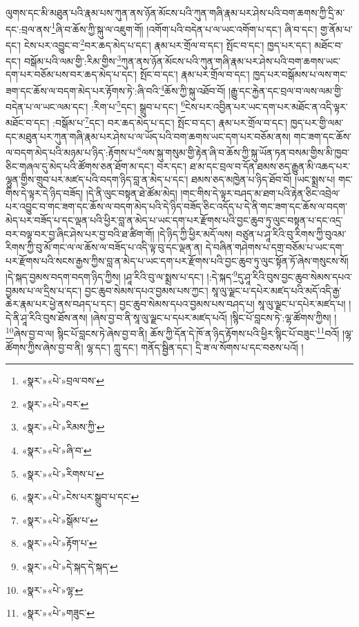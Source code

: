ལུགས་དང་མི་མཐུན་པའི་རྣམ་པས་ཀུན་ནས་ཉོན་མོངས་པའི་ཀུན་གཞི་རྣམ་པར་ཤེས་པའི་བག་ཆགས་ཀྱི་དྲི་མ་དང་:བྲལ་ནས་\footnote{«སྣར་»«པེ་»བྲལ་བས་}ཞི་བ་ཆོས་ཀྱི་སྐུ་ལ་འཇུག་གོ། །འགོག་པའི་བདེན་པ་ལ་ཡང་འགོག་པ་དང་། ཞི་བ་དང་། གྱ་ནོམ་པ་དང་། ངེས་པར་འབྱུང་བ་\footnote{«སྣར་»«པེ་»བར་}བར་ཆད་མེད་པ་དང་། རྣམ་པར་གྲོལ་བ་དང་། སྤོང་བ་དང་། ཁྱད་པར་དང་། མཐོང་བ་དང་། བསྒོམ་པའི་ལམ་གྱི་:རིམ་གྱིས་\footnote{«སྣར་»«པེ་»རིམས་ཀྱི་}ཀུན་ནས་ཉོན་མོངས་པའི་ཀུན་གཞི་རྣམ་པར་ཤེས་པའི་བག་ཆགས་ཡང་དག་པར་བཅོམ་པས་བར་ཆད་མེད་པ་དང་། སྤོང་བ་དང་། རྣམ་པར་གྲོལ་བ་དང་། ཁྱད་པར་བསྒོམས་པ་ལས་གང་ཟག་དང་ཆོས་ལ་བདག་མེད་པར་རྟོགས་ཏེ་:ཞི་བའི་\footnote{«སྣར་»«པེ་»ཞི་བ་}ཆོས་ཀྱི་སྐུ་འཐོབ་བོ། །རྒྱུ་དང་རྐྱེན་དང་བྲལ་བ་ལས་ལམ་གྱི་བདེན་པ་ལ་ཡང་ལམ་དང་། :རིག་པ་\footnote{«སྣར་»«པེ་»རིགས་པ་}དང་། སྒྲུབ་པ་དང་། \footnote{«སྣར་»«པེ་»ངེས་པར་སྒྲུབ་པ་དང་}ངེས་པར་འབྱིན་པར་ཡང་དག་པར་མཐོང་ན་འདི་ལྟར་མཐོང་བ་དང་། :བསྒོམ་པ་\footnote{«སྣར་»«པེ་»སྒོམ་པ་}དང་། བར་ཆད་མེད་པ་དང་། སྤོང་བ་དང་། རྣམ་པར་གྲོལ་བ་དང་། ཁྱད་པར་གྱི་ལམ་དང་མཐུན་པར་ཀུན་གཞི་རྣམ་པར་ཤེས་པ་ལ་ཡོད་པའི་བག་ཆགས་ཡང་དག་པར་བཅོམ་ནས། གང་ཟག་དང་ཆོས་ལ་བདག་མེད་པའི་མཉམ་པ་ཉིད་:རྟོགས་པ་\footnote{«སྣར་»«པེ་»རྟོག་པ་}ལས་སྐུ་གསུམ་གྱི་རྟེན་ཞི་བ་ཆོས་ཀྱི་སྐུ་ཡོན་ཏན་བསམ་གྱིས་མི་ཁྱབ་ཅིང་གཞལ་དུ་མེད་པའི་ཚོགས་ཅན་ཐོག་མ་དང་། བར་དང་། ཐ་མ་དང་བྲལ་བ་དོན་ཐམས་ཅད་རྒྱུན་མི་འཆད་པར་ལྷུན་གྱིས་གྲུབ་པར་མཛད་པའི་བདག་ཉིད་བླ་ན་མེད་པ་དང་། ཐམས་ཅད་མཁྱེན་པ་ཉིད་ཐོབ་བོ། །ཡང་སྨྲས་པ། གང་གིས་དེ་ལྟར་དེ་ཉིད་བཟོད། །དེ་ནི་ལུང་བསྟན་ཐེ་ཚོམ་མེད། །གང་གིས་དེ་ལྟར་བཤད་མ་ཐག་པའི་རྟེན་ཅིང་འབྲེལ་པར་འབྱུང་བ་གང་ཟག་དང་ཆོས་ལ་བདག་མེད་པའི་དེ་ཉིད་བཟོད་ཅིང་འདོད་པ་དེ་ནི་གང་ཟག་དང་ཆོས་ལ་བདག་མེད་པར་བཟོད་པ་དང་ལྡན་པའི་ཕྱིར་བླ་ན་མེད་པ་ཡང་དག་པར་རྫོགས་པའི་བྱང་ཆུབ་ཏུ་ལུང་བསྟན་པ་དང་འདྲ་བར་བལྟ་བར་བྱ་ཞིང་ཤེས་པར་བྱ་བའི་ཐ་ཚིག་གོ། །དེ་ཉིད་ཀྱི་ཕྱིར་མདོ་ལས། བཙུན་པ་ཤཱ་རིའི་བུ་རིགས་ཀྱི་བུའམ་རིགས་ཀྱི་བུ་མོ་གང་ལ་ལ་ཆོས་ལ་བཟོད་པ་འདི་ལྟ་བུ་དང་ལྡན་ན། དེ་བཞིན་གཤེགས་པ་དགྲ་བཅོམ་པ་ཡང་དག་པར་རྫོགས་པའི་སངས་རྒྱས་ཀྱིས་བླ་ན་མེད་པ་ཡང་དག་པར་རྫོགས་པའི་བྱང་ཆུབ་ཏུ་ལུང་སྟོན་ཏོ་ཞེས་གསུངས་སོ། །དེ་སྐད་བྱམས་བདག་བདག་ཉིད་ཀྱིས། །ཤཱ་རིའི་བུ་ལ་སྨྲས་པ་དང་། །:དེ་སྐད་\footnote{«སྣར་»«པེ་»དེ་སྐད་དེ་སྐད་}དུ་ཤཱ་རིའི་བུས་བྱང་ཆུབ་སེམས་དཔའ་བྱམས་པ་ལ་དྲིས་པ་དང་། བྱང་ཆུབ་སེམས་དཔའ་བྱམས་པས་ཀྱང་། སཱ་ལུ་ལྗང་པ་དཔེར་མཛད་པའི་མདོ་འདི་རྒྱ་ཆེར་རྣམ་པར་ཕྱེ་ནས་བཤད་པ་དང་། བྱང་ཆུབ་སེམས་དཔའ་བྱམས་པས་བཤད་པ། སཱ་ལུ་ལྗང་པ་དཔེར་མཛད་པ། །དེ་ནི་ཤཱ་རིའི་བུས་ཐོས་ནས། །ཞེས་བྱ་བ་ནི་སཱ་ལུ་ལྗང་པ་དཔར་མཛད་པའོ། །སྙིང་པོ་བླངས་ཏེ་:ལྷ་ཚོགས་ཀྱིས། །\footnote{«སྣར་»«པེ་»ལྷ་}ཞེས་བྱ་བ་ལ། སྙིང་པོ་བླངས་ཏེ་ཞེས་བྱ་བ་ནི། ཆོས་ཀྱི་དོན་དེ་ཁོ་ན་ཉིད་རྟོགས་པའི་ཕྱིར་སྙིང་པོ་བཟུང་\footnote{«སྣར་»«པེ་»གཟུང་}བའོ། །ལྷ་ཚོགས་ཀྱིས་ཞེས་བྱ་བ་ནི། ལྷ་དང་། ཀླུ་དང་། གནོད་སྦྱིན་དང་། དྲི་ཟ་ལ་སོགས་པ་དང་བཅས་པའོ། །
